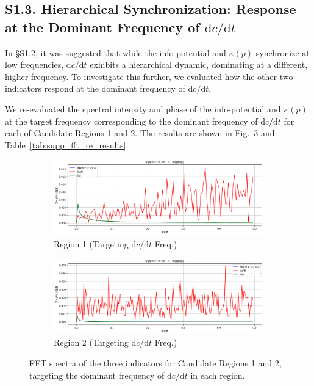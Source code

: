 \documentclass[a4paper,12pt]{article}
\begin{document}
\subsection*{S1.3. Hierarchical Synchronization: Response at the Dominant Frequency of $\mathrm{d}c/\mathrm{d}t$}
\label{subsec:supp_hierarchical_sync}

In §S1.2, it was suggested that while the info-potential and $\kappa(p)$ synchronize at low frequencies, $\mathrm{d}c/\mathrm{d}t$ exhibits a hierarchical dynamic, dominating at a different, higher frequency. To investigate this further, we evaluated how the other two indicators respond at the dominant frequency of $\mathrm{d}c/\mathrm{d}t$.

We re-evaluated the spectral intensity and phase of the info-potential and $\kappa(p)$ at the target frequency corresponding to the dominant frequency of $\mathrm{d}c/\mathrm{d}t$ for each of Candidate Regions 1 and 2. The results are shown in Fig.~\ref{fig:supp_fft_re_regions} and Table~\ref{tab:supp_fft_re_results}.

\begin{figure}[H]
    \centering
    \begin{subfigure}{0.48\linewidth}
        \includegraphics[width=\linewidth]{S1_fft_spectre_seq1.png}
        \caption{Region 1 (Targeting $\mathrm{d}c/\mathrm{d}t$ Freq.)}
        \label{fig:supp_fft_region1_re}
    \end{subfigure}
    \hfill
    \begin{subfigure}{0.48\linewidth}
        \includegraphics[width=\linewidth]{S1_fft_spectre_seq2.png}
        \caption{Region 2 (Targeting $\mathrm{d}c/\mathrm{d}t$ Freq.)}
        \label{fig:supp_fft_region2_re}
    \end{subfigure}
    \caption{FFT spectra of the three indicators for Candidate Regions 1 and 2, targeting the dominant frequency of $\mathrm{d}c/\mathrm{d}t$ in each region.}
    \label{fig:supp_fft_re_regions}
\end{figure}
\end{document}
